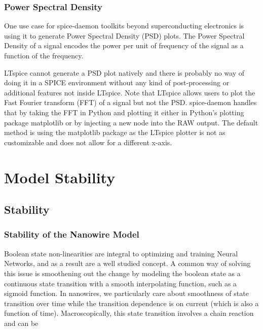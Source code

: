 \documentclass{article}
\newcommand{\cf}[1]{\textsf{#1}}
\begin{document}
\subsubsection{Power Spectral Density}

One use case for spice-daemon toolkits beyond superconducting electronics is using it to generate
Power Spectral Density (PSD) plots. The Power Spectral Density of a signal encodes the power per
unit of frequency of the signal as a function of the frequency. 


LTspice cannot generate a PSD plot natively and there is probably no way of doing it in a SPICE
environment without any kind of post-processing or additional features not inside LTspice.
Note that LTspice allows users to plot the Fast Fourier transform (FFT) of a signal but not the 
PSD. spice-daemon handles that by taking the FFT in Python and plotting it either in Python's 
plotting package \cf{matplotlib} or by injecting a new node into the RAW output. The default method is
using the \cf{matplotlib} package as the LTspice plotter is not as customizable and does not allow for
a different x-axis.


\section{Model Stability}

\subsection{Stability}


\subsubsection{Stability of the Nanowire Model}

Boolean state non-linearities are integral to optimizing and training Neural Networks, and as a 
result are a well studied concept. A common way of solving this issue is smoothening out the 
change by modeling the boolean state as a continuous state transition with a smooth interpolating
function, such as a sigmoid function. In nanowires, we particularly care about smoothness of state
transition over time while the transition dependence is on current (which is also a function of time).
Macroscopically, this state transition involves a chain reaction and can be 
\end{document}
